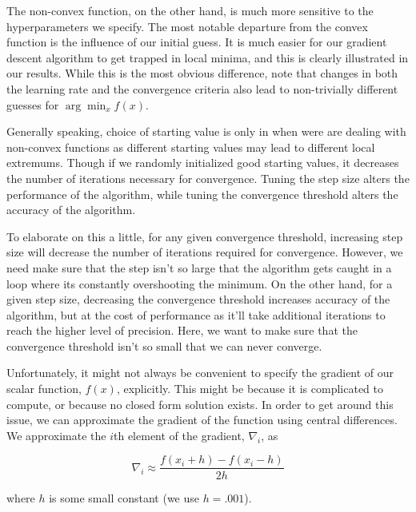 \documentclass[10pt]{article}
\begin{document}
The non-convex function, on the other hand, is much more sensitive to the hyperparameters we specify. The most notable departure from the convex function is the influence of our initial guess. It is much easier for our gradient descent algorithm to get trapped in local minima, and this is clearly illustrated in our results. While this is the most obvious difference, note that changes in both the learning rate and the convergence criteria also lead to non-trivially different guesses for $\arg\min_x {f(x)}$.

Generally speaking, choice of starting value is only in when were are dealing with non-convex functions as different starting values may lead to different local extremums. Though if we randomly initialized good starting values, it decreases the number of iterations necessary for convergence. Tuning the step size alters the performance of the algorithm, while tuning the convergence threshold alters the accuracy of the algorithm.

To elaborate on this a little, for any given convergence threshold, increasing step size will decrease the number of iterations required for convergence. However, we need make sure that the step isn't so large that the algorithm gets caught in a loop where its constantly overshooting the minimum. On the other hand, for a given step size, decreasing the convergence threshold increases accuracy of the algorithm, but at the cost of performance as it'll take additional iterations to reach the higher level of precision. Here, we want to make sure that the convergence threshold isn't so small that we can never converge.

Unfortunately, it might not always be convenient to specify the gradient of our scalar function, $f(x)$, explicitly. This might be because it is complicated to compute, or because no closed form solution exists. In order to get around this issue, we can approximate the gradient of the function using central differences. We approximate the $i$th element of the gradient, $\nabla_i$, as

\begin{equation}
\nabla_i \approx \frac{f(x_i+h) - f(x_i-h)}{2h}
\end{equation} 

\noindent where $h$ is some small constant (we use $h = .001$).
\end{document}
